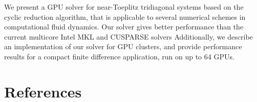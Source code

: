 \documentclass{elsarticle}
\begin{document}
We present a GPU solver for near-Toeplitz tridiagonal systems
based on the cyclic reduction algorithm,
that is applicable to several numerical schemes
in computational fluid dynamics.
Our solver gives better performance than
the current multicore Intel MKL and CUSPARSE solvers
Additionally, we describe an implementation of our solver
for GPU clusters,
and provide performance results for a
compact finite difference application,
run on up to 64 GPUs.

\pagebreak
\section*{References}


\end{document}
